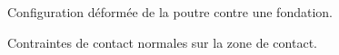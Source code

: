 \begin{figure}[ht!]
	\begin{center}
	\end{center}
		\caption{Configuration déformée de la poutre contre une fondation.}
		\label{poutre_def1}
\end{figure}
\begin{figure}[ht!]
	\begin{center}
	\end{center}
	\caption{Contraintes de contact normales sur la zone de contact.}
	\label{cont_uniB}
\end{figure}
